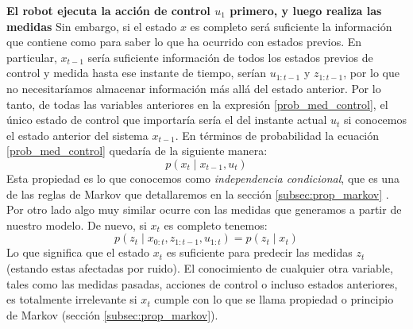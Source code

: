 \textbf{El robot ejecuta la acción de control $u_{1}$ primero, y luego realiza las medidas}
Sin embargo, si el estado $x$ es completo será suficiente la información que contiene como para saber lo que ha ocurrido con estados previos. 
En particular, $x_{t-1}$ sería suficiente información de todos los estados previos de control y medida hasta ese instante de tiempo, serían $u_{1:t-1}$ y $z_{1:t-1}$, por lo que no  necesitaríamos almacenar información más allá del estado anterior.
%
%
%
Por lo tanto, de todas las variables anteriores en la expresión \ref{prob_med_control}, el único estado de control que importaría sería el del instante actual $u_{t}$ si conocemos el estado anterior del sistema $x_{t-1}$. En términos de probabilidad la ecuación \ref{prob_med_control} quedaría de la siguiente manera:
\begin{equation}\label{prob_med_control_simplificado}
p(x_{t} \mid x_{t-1},u_{t})
\end{equation}
Esta propiedad es lo que conocemos como \textit{independencia condicional}, que es una de las reglas de Markov que detallaremos en la sección \ref{subsec:prop_markov} .
%
%
%
Por otro lado algo muy similar ocurre con las medidas que generamos a partir de nuestro modelo. De nuevo, si $x_{t}$ es completo tenemos:
\begin{equation}\label{prob_med_simple}
p(z_{t} \mid x_{0:t},z_{1:t-1},u_{1:t}) = p(z_{t} \mid x_{t})
\end{equation}
Lo que significa que el estado $x_{t}$ es suficiente para predecir las medidas $z_{t}$ (estando estas afectadas por ruido).
El conocimiento de cualquier otra variable, tales como las medidas pasadas, acciones de control o incluso estados anteriores, es totalmente irrelevante si $x_{t}$ cumple con lo que se llama propiedad o principio de Markov (sección \ref{subsec:prop_markov}).
%
%
%
